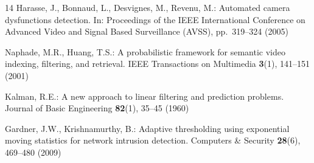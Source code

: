\documentclass[runningheads]{llncs}
\begin{document}
\begin{thebibliography}{14}
Harasse, J., Bonnaud, L., Desvignes, M., Revenu, M.: Automated camera
dysfunctions detection. In: Proceedings of the IEEE International
Conference on Advanced Video and Signal Based Surveillance (AVSS),
pp.~319--324 (2005)

Naphade, M.R., Huang, T.S.: A probabilistic framework for semantic video
indexing, filtering, and retrieval. IEEE Transactions on Multimedia
\textbf{3}(1), 141--151 (2001)

Kalman, R.E.: A new approach to linear filtering and prediction problems.
Journal of Basic Engineering \textbf{82}(1), 35--45 (1960)

Gardner, J.W., Krishnamurthy, B.: Adaptive thresholding using exponential
moving statistics for network intrusion detection. Computers \& Security
\textbf{28}(6), 469--480 (2009)

\end{thebibliography}
\end{document}
